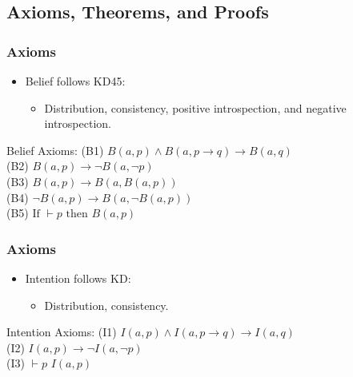 \documentclass[aspectratio=169]{beamer}
\begin{document}
\subsection{Axioms, Theorems, and Proofs}
\begin{frame}
\frametitle{Axioms}
\Large 
\begin{itemize}
    \item Belief follows KD45:
    \begin{itemize}
        \Large 
        \item Distribution, consistency, positive introspection, and negative introspection.
    \end{itemize}
\end{itemize}
\begin{block}{Belief Axioms:}
    \Large
    \normalfont
    (B1) $B(a, p) \wedge B(a, p \rightarrow q) \rightarrow B(a, q)$ \\
    (B2) $B(a, p) \rightarrow \neg B(a, \neg p)$ \\
    (B3) $B(a, p) \rightarrow B(a, B(a, p))$ \\
    (B4) $\neg B(a, p) \rightarrow B(a, \neg B(a, p))$ \\    
    (B5) $\text{If } \vdash p \text{ then } B(a, p)$
\end{block}
\end{frame}

\begin{frame}
\frametitle{Axioms}
\Large 
\begin{itemize}
    \item Intention follows KD:
    \begin{itemize}
        \Large 
        \item Distribution, consistency.
    \end{itemize}
\end{itemize}
\begin{block}{Intention Axioms:}
    \Large
    \normalfont
    (I1) $I(a, p) \wedge I(a, p \rightarrow q) \rightarrow I(a, q)$ \\
    (I2) $I(a, p) \rightarrow \neg I(a, \neg p)$ \\
    (I3)  $\vdash p$  $I(a, p)$
\end{block}
\end{frame}
\end{document}
